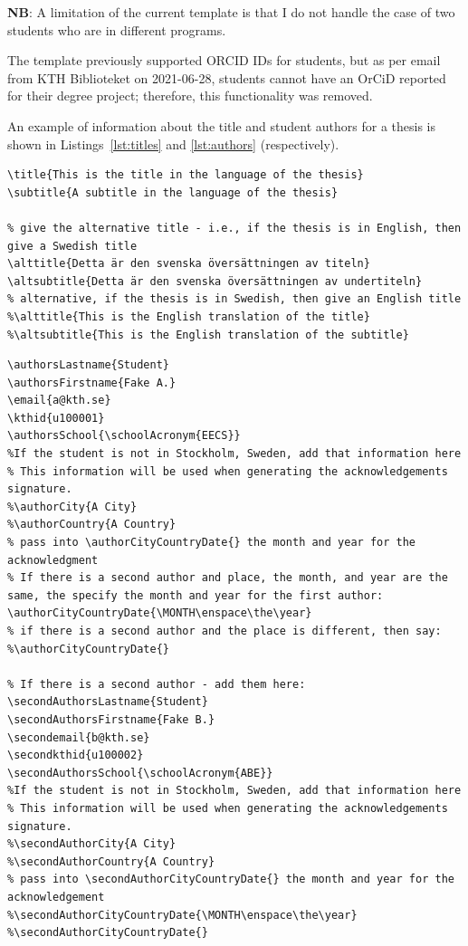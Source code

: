 \textbf{NB}: A limitation of the current template is that I do not handle the case of two students who are in different programs.

The template previously supported ORCID IDs for students, but as per email from KTH Biblioteket on 2021-06-28, students cannot have an OrCiD reported for their degree project; therefore, this functionality was removed.


An example of information about the title and student authors for a thesis is shown in Listings~\ref{lst:titles} and \ref{lst:authors} (respectively).
\begin{lstlisting}[language={[LaTeX]TeX}, caption={Information about the titles and subtitles of the thesis}, label=lst:titles]
\title{This is the title in the language of the thesis}
\subtitle{A subtitle in the language of the thesis}

% give the alternative title - i.e., if the thesis is in English, then give a Swedish title
\alttitle{Detta är den svenska översättningen av titeln}
\altsubtitle{Detta är den svenska översättningen av undertiteln}
% alternative, if the thesis is in Swedish, then give an English title
%\alttitle{This is the English translation of the title}
%\altsubtitle{This is the English translation of the subtitle}
\end{lstlisting}
\begin{lstlisting}[language={[LaTeX]TeX}, caption={Information about the student authors of the thesis}, label=lst:authors] 
\authorsLastname{Student}
\authorsFirstname{Fake A.}
\email{a@kth.se}
\kthid{u100001}
\authorsSchool{\schoolAcronym{EECS}}
%If the student is not in Stockholm, Sweden, add that information here
% This information will be used when generating the acknowledgements signature.
%\authorCity{A City}
%\authorCountry{A Country}
% pass into \authorCityCountryDate{} the month and year for the acknowledgment
% If there is a second author and place, the month, and year are the same, the specify the month and year for the first author:
\authorCityCountryDate{\MONTH\enspace\the\year}
% if there is a second author and the place is different, then say:
%\authorCityCountryDate{}

% If there is a second author - add them here:
\secondAuthorsLastname{Student}
\secondAuthorsFirstname{Fake B.}
\secondemail{b@kth.se}
\secondkthid{u100002}
\secondAuthorsSchool{\schoolAcronym{ABE}}
%If the student is not in Stockholm, Sweden, add that information here
% This information will be used when generating the acknowledgements signature.
%\secondAuthorCity{A City}
%\secondAuthorCountry{A Country}
% pass into \secondAuthorCityCountryDate{} the month and year for the acknowledgement
%\secondAuthorCityCountryDate{\MONTH\enspace\the\year}
%\secondAuthorCityCountryDate{}
\end{lstlisting}


